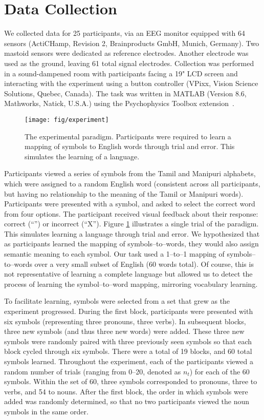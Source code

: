 \section{Data Collection}

We collected data for 25 participants, via an EEG monitor equipped with 64 sensors (ActiCHamp, Revision 2, Brainproducts GmbH, Munich, Germany). Two mastoid sensors were dedicated as reference electrodes. Another electrode was used as the ground, leaving 61 total signal electrodes. Collection was performed in a sound-dampened room with participants facing a 19" LCD screen and interacting with the experiment using a button controller (VPixx, Vision Science Solutions, Quebec, Canada). The task was written in MATLAB (Version 8.6, Mathworks, Natick, U.S.A.) using the Psychophysics Toolbox extension~\cite{brainard1997psychophysics}.

\begin{figure}[t]
  \centering
  \texttt{[image: fig/experiment]}
  \caption{The experimental paradigm. Participants were required to learn a mapping of symbols to English words through trial and error. This simulates the learning of a language.}
  \label{fig:experiment}
\end{figure}

Participants viewed a series of symbols from the Tamil and Manipuri alphabets, which were assigned to a random English word (consistent across all participants, but having no relationship to the meaning of the Tamil or Manipuri words).  Participants were presented with a symbol, and asked to select the correct word from four options. The participant received visual feedback about their response: correct (``\CheckmarkBold'') or incorrect (``X''). Figure \ref{fig:experiment} illustrates a single trial of the paradigm. This simulates learning a language through trial and error. We hypothesized that as participants learned the mapping of symbols--to--words, they would also assign semantic meaning to each symbol. Our task used a 1--to--1 mapping of symbols--to--words over a very small subset of English (60 words total). Of course, this is not representative of learning a complete language but allowed us to detect the process of learning the symbol--to--word mapping, mirroring vocabulary learning.
  
To facilitate learning, symbols were selected from a set that grew as the experiment progressed. During the first block, participants were presented with six symbols (representing three pronouns, three verbs). In subsequent blocks, three new symbols (and thus three new words) were added. These three new symbols were randomly paired with three previously seen symbols so that each block cycled through six symbols. There were a total of 19 blocks, and 60 total symbols learned. Throughout the experiment, each of the participants viewed a random number of trials (ranging from 0--20, denoted as $n_t$) for each of the 60 symbols. Within the set of 60, three symbols corresponded to pronouns, three to verbs, and 54 to nouns. After the first block, the order in which symbols were added was randomly determined, so that no two participants viewed the noun symbols in the same order.
  
